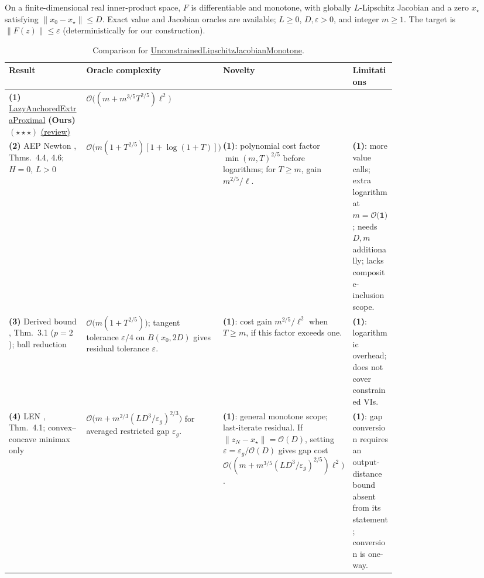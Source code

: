 \begin{table}[tp]
\centering
\caption{Comparison for \href{https://github.com/k3nfalt/longtails/blob/main/LongTails/Setups/UnconstrainedLipschitzJacobianMonotone.lean}{UnconstrainedLipschitzJacobianMonotone}.}\label{tab:UnconstrainedLipschitzJacobianMonotone}
\parbox{\linewidth}{\footnotesize On a finite-dimensional real inner-product space, $F$ is differentiable and monotone, with globally $L$-Lipschitz Jacobian and a zero $x_\star$ satisfying $\|x_0-x_\star\|\le D$. Exact value and Jacobian oracles are available; $L\ge0$, $D,\varepsilon>0$, and integer $m\ge1$. The target is $\|F(z)\|\le\varepsilon$ (deterministically for our construction).}\par\smallskip
\begin{threeparttable}
\footnotesize
\setlength{\tabcolsep}{4pt}\renewcommand{\arraystretch}{1.25}
\begin{tabularx}{\linewidth}{@{}>{\raggedright\arraybackslash}p{0.20\linewidth}>{\raggedright\arraybackslash}p{0.32\linewidth}>{\raggedright\arraybackslash}p{0.25\linewidth}>{\raggedright\arraybackslash}X@{}}
\toprule
\textbf{Result} & \textbf{Oracle complexity} & \textbf{Novelty} & \textbf{Limitations} \\
\midrule
\textbf{(1)} \href{https://github.com/k3nfalt/longtails/blob/main/LongTails/Theorems/LazyAnchoredExtraProximal.lean}{Lazy\allowbreak Anchored\allowbreak Extra\allowbreak Proximal} \textbf{(Ours)} $(\star\star\star)$ \href{https://github.com/k3nfalt/longtails/blob/main/scripts/reviews/LazyAnchoredExtraProximal.md}{(review)} & $\mathcal{O}\bigl((m+m^{3/5}T^{2/5})\ell^2\bigr)$ & & \\
\midrule[1.2pt]
\textbf{(2)} AEP Newton \citep{uljmJiangYoon2026v1}, Thms.~4.4, 4.6; $H=0$, $L>0$ & $\mathcal{O}\bigl(m(1+T^{2/5})[1+\log(1+T)]\bigr)$ & \textbf{(1)}: polynomial cost factor $\min(m,T)^{2/5}$ before logarithms; for $T\ge m$, gain $m^{2/5}/\ell$. & \textbf{(1)}: more value calls; extra logarithm at $m=\mathcal{O}\textbf{(1)}$; needs $D,m$ additionally; lacks composite-inclusion scope. \\
\midrule
\textbf{(3)} Derived bound \citep{uljmZhang2026v1}, Thm.~3.1 ($p=2$); ball reduction & $\mathcal{O}\bigl(m(1+T^{2/5})\bigr)$; tangent tolerance $\varepsilon/4$ on $B(x_0,2D)$ gives residual tolerance $\varepsilon$. & \textbf{(1)}: cost gain $m^{2/5}/\ell^2$ when $T\ge m$, if this factor exceeds one. & \textbf{(1)}: logarithmic overhead; does not cover constrained VIs. \\
\midrule
\textbf{(4)} LEN \citep{uljmChen2025v2}, Thm.~4.1; convex--concave minimax only & $\mathcal{O}\bigl(m+m^{2/3}(LD^3/\varepsilon_g)^{2/3}\bigr)$ for averaged restricted gap $\varepsilon_g$. & \textbf{(1)}: general monotone scope; last-iterate residual. If $\|z_N-x_\star\|=\mathcal{O}(D)$, setting $\varepsilon=\varepsilon_g/\mathcal{O}(D)$ gives gap cost $\mathcal{O}\bigl((m+m^{3/5}(LD^3/\varepsilon_g)^{2/5})\ell^2\bigr)$. & \textbf{(1)}: gap conversion requires an output-distance bound absent from its statement; conversion is one-way. \\

\end{tabularx}
\end{threeparttable}
\end{table}
